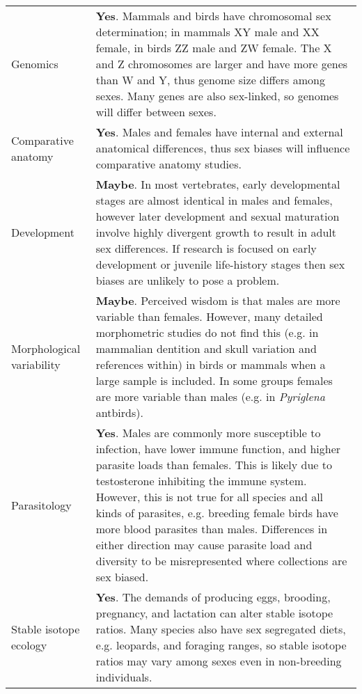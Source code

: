 \begin{longtable}{p{3cm} p{16cm}}
  Genomics & \textbf{Yes}. Mammals and birds have chromosomal sex determination; in mammals XY male and XX female, in birds ZZ male and ZW female\cite{stevens1997sex}. The X and Z chromosomes are larger and have more genes than W and Y, thus genome size differs among sexes. Many genes are also sex-linked, so genomes will differ between sexes.\\ 

  Comparative anatomy & \textbf{Yes}. Males and females have internal and external anatomical differences, thus sex biases will influence comparative anatomy studies.\\ 

  Development & \textbf{Maybe}. In most vertebrates, early developmental stages are almost identical in males and females, however later development and sexual maturation involve highly divergent growth to result in adult sex differences\cite{badyaev2002growing}. If research is focused on early development or juvenile life-history stages then sex biases are unlikely to pose a problem.\\

  Morphological variability & \textbf{Maybe}. Perceived wisdom is that males are more variable than females. However, many detailed morphometric studies do not find this (e.g. in mammalian dentition and skull variation\cite{polly1998variability,biswas2019} and references within) in birds or mammals when a large sample is included. In some groups females are more variable than males (e.g. in \textit{Pyriglena} antbirds\cite{isler2017calls}).\\ 

  Parasitology & \textbf{Yes}. Males are commonly more susceptible to infection, have lower immune function, and higher parasite loads than females\cite{zuk2009sicker}. This is likely due to testosterone inhibiting the immune system\cite{Klein:2016aa}. However, this is not true for all species and all kinds of parasites, e.g. breeding female birds have more blood parasites than males\cite{mccurdy1998sex}. Differences in either direction may cause parasite load and diversity to be misrepresented where collections are sex biased.\\ 

  Stable isotope ecology & \textbf{Yes}. The demands of producing eggs, brooding, pregnancy, and lactation can alter stable isotope ratios\cite{fuller2004nitrogen}. Many species also have sex segregated diets, e.g. leopards\cite{voigt2018sex}, and foraging ranges, so stable isotope ratios may vary among sexes even in non-breeding individuals.\\ 


\end{longtable}
